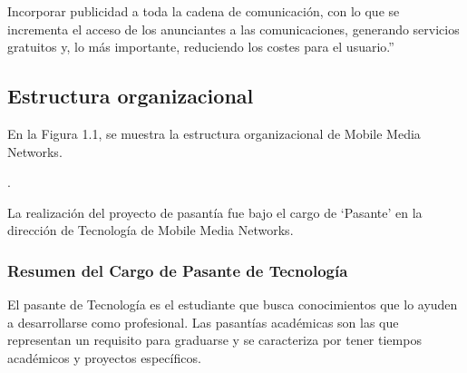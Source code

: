 Incorporar publicidad a toda la cadena de comunicación, con lo que
se incrementa el acceso de los anunciantes a las comunicaciones, generando
servicios gratuitos y, lo más importante, reduciendo los costes para
el usuario.\textquotedblright{}\cite{Cap1.AdsMedia}


\subsection{Estructura organizacional}

En la Figura 1.1, se muestra la estructura organizacional de Mobile
Media Networks.

.

\vspace*{1cm}


\begin{center}
\begin{figure}[h]
\centering{}%
\end{figure}

\par\end{center}

La realización del proyecto de pasantía fue bajo el cargo de \textquoteleft{}Pasante\textquoteright{}
en la dirección de Tecnología de Mobile Media Networks.


\subsubsection{Resumen del Cargo de Pasante de Tecnología}

El pasante de Tecnología es el estudiante que busca conocimientos
que lo ayuden a desarrollarse como profesional. Las pasantías académicas
son las que representan un requisito para graduarse y se caracteriza
por tener tiempos académicos y proyectos específicos.\cite{Cap1.Mobile}
\newpage{}
